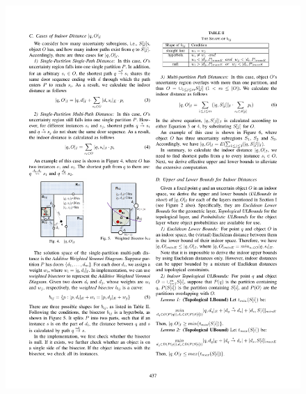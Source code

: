 \begin{frame}
\begin{columns}[c]
  \begin{figure}[tb]
    \includegraphics[width=\columnwidth]{figures/2-6/2-6-3.pdf}
  \end{figure}

\end{columns}

\end{frame}


